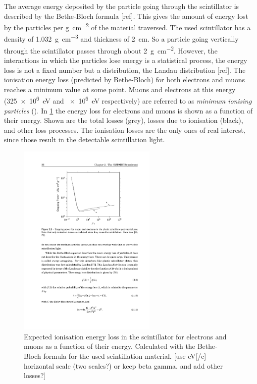 The average energy deposited by the particle going through the scintillator is described by the Bethe-Bloch formula [ref]. This gives the amount of energy lost by the particles per \si{\gram\per\centi\meter\squared} of the material traversed. The used scintillator has a density of \SI{1.032}{\gram\per\centi\meter\cubed} and thickness of \SI{2}{\centi\meter}. So a particle going vertically through the scintillator passes through about \SI{2}{\gram\per\centi\meter\squared}. However, the interactions in which the particles lose energy is a statistical process, the energy loss is not a fixed number but a distribution, the Landau distribution [ref]. The ionisation energy loss (predicted by Bethe-Bloch) for both electrons and muons reaches a minimum value at some point. Muons and electrons at this energy (\SI{325e6}{\eV} and \SI{e6}{\eV} respectively) are referred to as \textit{minimum ionising particles} (\mip). In \cref{fig:bethe-bloch} the energy loss for electrons and muons is shown as a function of their energy. Shown are the total losses (grey), losses due to ionisation (black), and other loss processes. The ionisation losses are the only ones of real interest, since those result in the detectable scintillation light.


\begin{figure}
    \centering
    \includegraphics[width=0.6\textwidth]
                    {plots/station/bethe-bloch}
    \caption{Expected ionisation energy loss in the scintillator for electrons and muons as a function of their energy. Calculated with the Bethe-Bloch formula for the used scintillation material. [use eV[/c] horizontal scale (two scales?) or keep beta gamma. and add other losses?]}
    \label{fig:bethe-bloch}
\end{figure}

